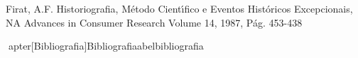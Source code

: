 \documentclass[
12pt,		%
openright,	%
twoside,  %
a4paper,			%
chapter=TITLE,		%
english,			%
french,				%
spanish,			%
brazil				%
]{USPSC-classe/USPSC}
\begin{document}
\begin{flushleft}
\begin{flushleft}
[Firat, 1987] Firat, A.F. Historiografia, M\'etodo Cient\'{\i}fico e Eventos Hist\'oricos Excepcionais, NA Advances in Consumer Research Volume 14, 1987, P\'ag. 453-438
\end{flushleft}


\end{flushleft}


\begin{flushleft}
\begin{flushleft}

\end{flushleft}


\end{flushleft}


\begin{flushleft}
\begin{flushleft}

\end{flushleft}


\end{flushleft}


\begin{flushleft}
\begin{flushleft}

\end{flushleft}


\end{flushleft}





\postextual

apter[Bibliografia]{Bibliografia}abel{bibliografia}




%
%







\end{document}
